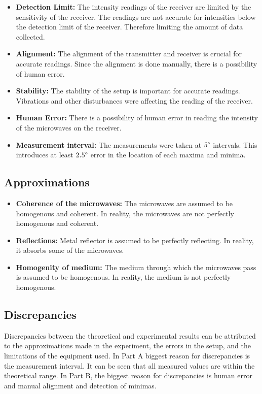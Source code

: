 \documentclass[10pt]{article}
\begin{document}
\begin{itemize}
  \item \textbf{Detection Limit:} The intensity readings of the receiver are limited by the sensitivity of the receiver. The readings are not accurate for intensities below the detection limit of the receiver. Therefore limiting the amount of data collected. 
  \item \textbf{Alignment:} The alignment of the transmitter and receiver is crucial for accurate readings. Since the alignment is done manually, there is a possibility of human error.
  \item \textbf{Stability:} The stability of the setup is important for accurate readings. Vibrations and other disturbances were affecting the reading of the receiver.
  \item \textbf{Human Error:} There is a possibility of human error in reading the intensity of the microwaves on the receiver.
  \item \textbf{Measurement interval:} The measurements were taken at $5\degree$ intervals. This introduces at least $2.5\degree$ error in the location of each maxima and minima.
\end{itemize}

\subsection*{Approximations}
\begin{itemize}
  \item \textbf{Coherence of the microwaves:} The microwaves are assumed to be homogenous and coherent. In reality, the microwaves are not perfectly homogenous and coherent.
  \item \textbf{Reflections:} Metal reflector is assumed to be perfectly reflecting. In reality, it absorbs some of the microwaves.
  \item \textbf{Homogenity of medium:} The medium through which the microwaves pass is assumed to be homogenous. In reality, the medium is not perfectly homogenous.
\end{itemize}
\subsection*{Discrepancies}
Discrepancies between the theoretical and experimental results can be attributed to the approximations made in the experiment, the errors in the setup, and the limitations of the equipment used.
In Part A biggest reason for discrepancies is the measurement interval. It can be seen that all measured values are within the theoretical range. In Part B, the biggest reason for discrepancies is human error and manual alignment and detection of minimas.
\end{document}
